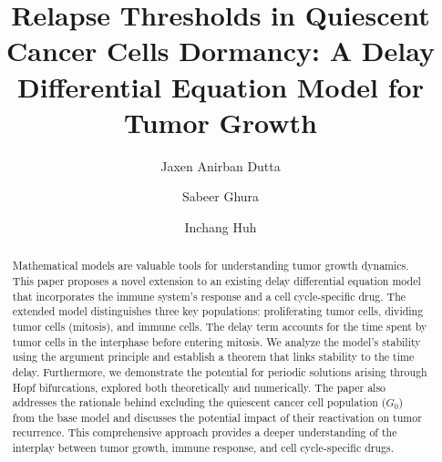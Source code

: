 \documentclass[sigplan,screen]{acmart}
\begin{document}
\title{Relapse Thresholds in Quiescent Cancer Cells Dormancy: A Delay Differential Equation Model for Tumor Growth}

\author{Jaxen Anirban Dutta}

\author{Sabeer Ghura}

\author{Inchang Huh}

\renewcommand{\shortauthors}{Dutta}

\begin{abstract}
Mathematical models are valuable tools for understanding tumor growth dynamics. This paper proposes a novel extension to an existing delay differential equation model that incorporates the immune system's response and a cell cycle-specific drug. The extended model distinguishes three key populations: proliferating tumor cells, dividing tumor cells (mitosis), and immune cells. The delay term accounts for the time spent by tumor cells in the interphase before entering mitosis. We analyze the model's stability using the argument principle and establish a theorem that links stability to the time delay. Furthermore, we demonstrate the potential for periodic solutions arising through Hopf bifurcations, explored both theoretically and numerically. The paper also addresses the rationale behind excluding the quiescent cancer cell population ($G_0$) from the base model and discusses the potential impact of their reactivation on tumor recurrence. This comprehensive approach provides a deeper understanding of the interplay between tumor growth, immune response, and cell cycle-specific drugs.
\end{abstract}
\end{document}

